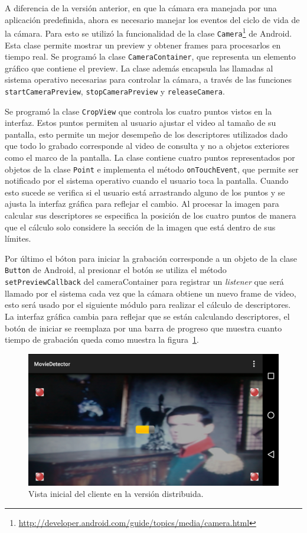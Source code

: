 A diferencia de la versión anterior, en que la cámara era manejada por una aplicación predefinida, ahora es necesario manejar los eventos del ciclo de vida de la cámara. Para esto se utilizó la funcionalidad de la clase \texttt{Camera}\footnote{\url{http://developer.android.com/guide/topics/media/camera.html}} de Android. Esta clase permite mostrar un preview y obtener frames para procesarlos en tiempo real. Se programó la clase \texttt{CameraContainer}, que representa un elemento gráfico que contiene el preview. La clase además encapsula las llamadas al sistema operativo necesarias para controlar la cámara, a través de las funciones \texttt{startCameraPreview}, \texttt{stopCameraPreview} y \texttt{releaseCamera}.

Se programó la clase \texttt{CropView} que controla los cuatro puntos vistos en la interfaz. Estos puntos permiten al usuario ajustar el video al tamaño de su pantalla, esto permite un mejor desempeño de los descriptores utilizados dado que todo lo grabado corresponde al video de consulta y no a objetos exteriores como el marco de la pantalla. La clase contiene cuatro puntos representados por objetos de la clase \texttt{Point} e implementa el método \texttt{onTouchEvent}, que permite ser notificado por el sistema operativo cuando el usuario toca la pantalla. Cuando esto sucede se verifica si el usuario está arrastrando alguno de los puntos y se ajusta la interfaz gráfica para reflejar el cambio. Al procesar la imagen para calcular sus descriptores se especifica la posición de los cuatro puntos de manera que el cálculo solo considere la sección de la imagen que está dentro de sus límites.

Por último el bóton para iniciar la grabación corresponde a un objeto de la clase \texttt{Button} de Android, al presionar el botón se utiliza el método \texttt{setPreviewCallback} del cameraContainer para registrar un \emph{listener} que será llamado por el sistema cada vez que la cámara obtiene un nuevo frame de video, esto será usado por el siguiente módulo para realizar el cálculo de descriptores. La interfaz gráfica cambia para reflejar que se están calculando descriptores, el botón de iniciar se reemplaza por una barra de progreso que muestra cuanto tiempo de grabación queda como muestra la figura~\ref{pantalla_calculando_distribuida}.
	\begin{figure}[!h]
		\centering
		\includegraphics[scale=0.3]{imagenes/cap4/pantalla_calculando_distribuida.png}
		\caption{Vista inicial del cliente en la versión distribuida.}
		\label{pantalla_calculando_distribuida}
	\end{figure}

